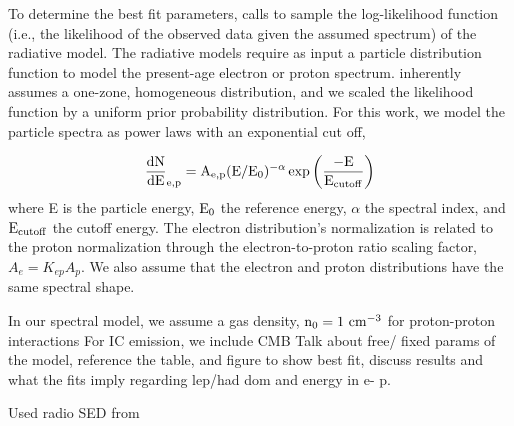 To determine the best fit parameters, \nai{} calls \emc{} to sample the log-likelihood function (i.e.,  the likelihood of the observed data given the assumed spectrum) of the radiative model. The radiative models require as input a particle distribution function to model the present-age electron or proton spectrum. \nai{} inherently assumes a one-zone, homogeneous distribution, and we scaled the likelihood function by a uniform prior probability distribution. For this work, we model the particle spectra as power laws with an exponential cut off,

\begin{equation}
{\rm \frac{dN}{dE}_{e,p} = A_{e,p} (E / E_0) ^{-\alpha} \exp {\bigg ( }\frac{- E}{ E_{cutoff}}{\bigg)}}
\end{equation}
where E is the particle energy, ${\rm E_0}$ the reference energy, $\alpha$ the spectral index, and ${\rm E_{cutoff}}$ the cutoff energy. The electron distribution's normalization is related to the proton normalization through the electron-to-proton ratio scaling factor, $A_e = K_{ep} A_p$. We also assume that the electron and proton distributions have the same spectral shape.

In our spectral model, we assume a gas density, ${\rm n_0 = 1~cm^{-3}}$ for proton-proton  interactions For IC emission, we include CMB  
Talk about free/ fixed params of the model, reference the table, and figure to show best fit, discuss results and what the fits imply regarding lep/had dom and energy in e- p.

Used radio SED from \citep{Gerbrandt14}









